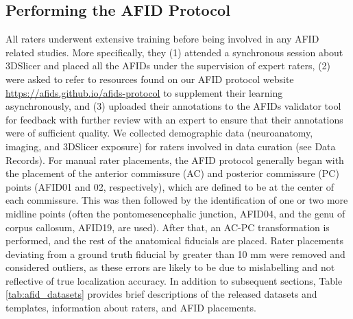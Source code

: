 \subsection{Performing the AFID Protocol}
All raters underwent extensive training before being involved in any AFID related studies. More specifically, they (1) attended a synchronous session about 3DSlicer and placed all the AFIDs under the supervision of expert raters, (2) were asked to refer to resources found on our AFID protocol website \url{https://afids.github.io/afids-protocol} to supplement their learning asynchronously, and (3) uploaded their annotations to the AFIDs validator tool for feedback with further review with an expert to ensure that their annotations were of sufficient quality. We collected demographic data (neuroanatomy, imaging, and 3DSlicer exposure) for raters involved in data curation (see Data Records).
For manual rater placements, the AFID protocol generally began with the placement of the anterior commissure (AC) and posterior commissure (PC) points (AFID01 and 02, respectively), which are defined to be at the center of each commissure. This was then followed by the identification of one or two more midline points (often the pontomesencephalic junction, AFID04, and the genu of corpus callosum, AFID19, are used). After that, an AC-PC transformation is performed, and the rest of the anatomical fiducials are placed. Rater placements deviating from a ground truth fiducial by greater than 10 mm were removed and considered outliers, as these errors are likely to be due to mislabelling and not reflective of true localization accuracy. In addition to subsequent sections, Table \ref{tab:afid_datasets} provides brief descriptions of the released datasets and templates, information about raters, and AFID placements.

